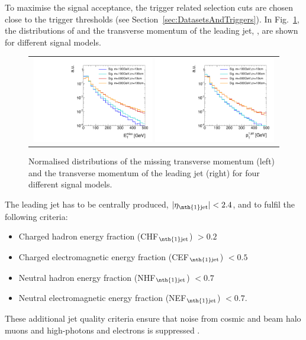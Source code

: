 To maximise the signal acceptance, the trigger related selection cuts are chosen close to the trigger thresholds (see Section~\ref{sec:DatasetsAndTriggers}).
In Fig.~\ref{fig:SignalMET+SignalJetPt}, the distributions of \met and the transverse momentum of the leading jet, \ptfirstjet, are shown for different signal models.
\begin{figure}[!t]
  \centering 
  \begin{tabular}{c}
    \includegraphics[width=0.49\textwidth]{figures/analysis/AnalysisSelection/hMetSmallRange_log_chiTracksnoSelection_4Signals.pdf}
    \includegraphics[width=0.49\textwidth]{figures/analysis/AnalysisSelection/h1stjetptSmallRange_log_chiTracksnoSelection_4Signals.pdf}
  \end{tabular}
  \caption{Normalised distributions of the missing transverse momentum (left) and the transverse momentum of the leading jet (right) for four different signal models.}
  \label{fig:SignalMET+SignalJetPt}
\end{figure}
The leading jet has to be centrally produced, $|\eta_{\text{\nth{1}jet}}|<2.4$, and to fulfil the following criteria: %
\begin{itemize}
\item Charged hadron energy fraction (CHF$_{\text{\nth{1}jet}}$) $>0.2$
\item Charged electromagnetic energy fraction (CEF$_{\text{\nth{1}jet}}$) $<0.5$
\item Neutral hadron energy fraction (NHF$_{\text{\nth{1}jet}}$) $<0.7$
\item Neutral electromagnetic energy fraction (NEF$_{\text{\nth{1}jet}}$) $<0.7$.
\end{itemize}
These additional jet quality criteria ensure that noise from cosmic and beam halo muons and high-\pt photons and electrons is suppressed \cite{bib:CMS:DM_8TeV_AN}.

